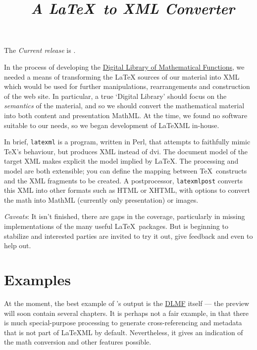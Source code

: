 \documentclass{article}
\title{\LaTeXML\ \emph{A \LaTeX\ to XML Converter}}
\begin{document}
\label{top}
\maketitle

The \emph{Current release} is .

In the process of developing the
\href{http://dlmf.nist.gov/}{Digital Library of Mathematical Functions},
we needed a means of transforming
the LaTeX sources of our material into XML which would be used
for further manipulations, rearrangements and construction of the web site.
In particular, a true `Digital Library' should focus on the \emph{semantics}
of the material, and so we should convert the mathematical material into both
content and presentation MathML.
At the time, we found no software suitable to our needs, so we began
development of LaTeXML in-house.  

In brief, \texttt{latexml} is a program, written in Perl, that attempts to
faithfully mimic \TeX's behaviour, but produces XML instead of dvi.
The document model of the target XML makes explicit the model implied
by \LaTeX.
The processing and model are both extensible; you can define
the mapping between \TeX\ constructs and the XML fragments to be created.
A postprocessor, \texttt{latexmlpost} converts this
XML into other formats such as HTML or XHTML, with options
to convert the math into MathML (currently only presentation) or images.

\emph{Caveats}: It isn't finished, there are gaps in the coverage,
particularly in missing implementations of the many useful \LaTeX\ packages.
But is beginning to stabilize and interested parties
are invited to try it out, give feedback and even to help out.


\section{Examples}\label{examples}
At the moment, the best example of \LaTeXML's output is 
the \href{http://dlmf.nist.gov/}{DLMF} itself
--- the preview  will soon contain several chapters.
It is perhaps not a fair example, in that there is much
special-purpose processing to generate cross-referencing and metadata that is not
part of LaTeXML by default. Nevertheless, it gives an indication of the
math conversion and other features possible.
\end{document}
